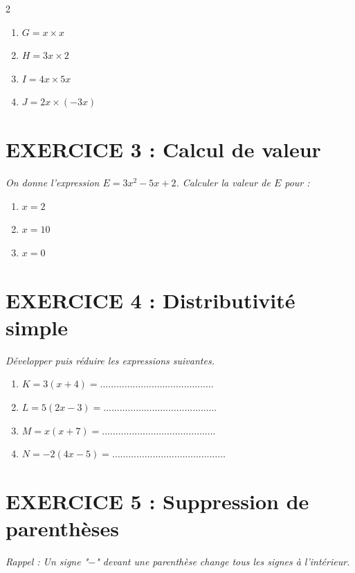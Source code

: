 \documentclass[11pt,a4paper]{article}
\begin{document}
    \begin{multicols}{2}
    \begin{enumerate}
        \item $G = x \times x$
        \item $H = 3x \times 2$
        \item $I = 4x \times 5x$
        \item $J = 2x \times (-3x)$
    \end{enumerate}
    \end{multicols}
    
    \section*{EXERCICE 3 : Calcul de valeur}
    \textit{On donne l'expression $E = 3x^2 - 5x + 2$. Calculer la valeur de $E$ pour :}
    
    \begin{enumerate}
        \item $x = 2$ \dotfill
        \item $x = 10$ \dotfill
        \item $x = 0$ \dotfill
    \end{enumerate}
    
    \newpage %
    
    \section*{EXERCICE 4 : Distributivité simple}
    \textit{Développer puis réduire les expressions suivantes.}
    
    \begin{enumerate}
        \item $K = 3(x + 4) = \dots\dots\dots\dots\dots\dots\dots\dots\dots\dots\dots\dots\dots\dots$
        \item $L = 5(2x - 3) = \dots\dots\dots\dots\dots\dots\dots\dots\dots\dots\dots\dots\dots\dots$
        \item $M = x(x + 7) = \dots\dots\dots\dots\dots\dots\dots\dots\dots\dots\dots\dots\dots\dots$
        \item $N = -2(4x - 5) = \dots\dots\dots\dots\dots\dots\dots\dots\dots\dots\dots\dots\dots\dots$
    \end{enumerate}
    
    \section*{EXERCICE 5 : Suppression de parenthèses}
    \textit{Rappel : Un signe "$-$" devant une parenthèse change tous les signes à l'intérieur.}
    
\end{document}
